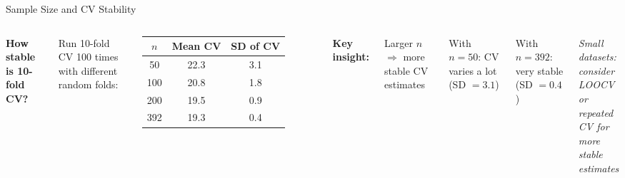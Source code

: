 \documentclass[aspectratio=169, 11pt]{beamer}
\begin{document}
\begin{frame}{Sample Size and CV Stability}
\begin{columns}
\textbf{How stable is 10-fold CV?}

\vspace{0.3em}
Run 10-fold CV 100 times with different random folds:

\begin{tabular}{ccc}
\toprule
$n$ & Mean CV & SD of CV \\
\midrule
50 & 22.3 & 3.1 \\
100 & 20.8 & 1.8 \\
200 & 19.5 & 0.9 \\
392 & 19.3 & 0.4 \\
\bottomrule
\end{tabular}

\textbf{Key insight:}

Larger $n$ $\Rightarrow$ more stable CV estimates

\vspace{0.3em}
With $n = 50$: CV varies a lot (SD $= 3.1$)

With $n = 392$: very stable (SD $= 0.4$)

\vspace{0.5em}
\textit{Small datasets: consider LOOCV\\or repeated CV for more stable\\estimates}
\end{columns}
\end{frame}
\end{document}

